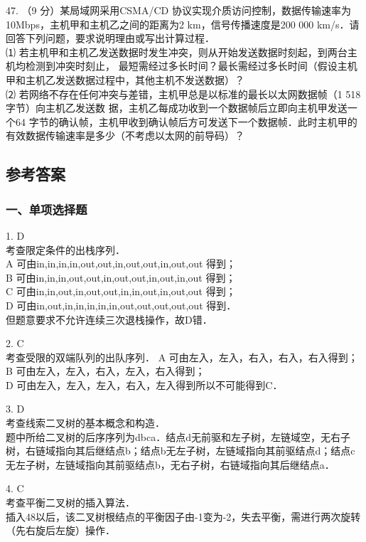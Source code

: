 47. （9 分）某局域网采用CSMA/CD 协议实现介质访问控制，数据传输速率为10Mbps，主机甲和主机乙之间的距离为2 km，信号传播速度是200 000 km/s．请回答下列问题，要求说明理由或写出计算过程． \\
⑴ 若主机甲和主机乙发送数据时发生冲突，则从开始发送数据时刻起，到两台主机均检测到冲突时刻止，
最短需经过多长时间？最长需经过多长时间（假设主机甲和主机乙发送数据过程中，其他主机不发送数据）？ \\
⑵ 若网络不存在任何冲突与差错，主机甲总是以标准的最长以太网数据帧（1 518字节）向主机乙发送数
据，主机乙每成功收到一个数据帧后立即向主机甲发送一个64 字节的确认帧，主机甲收到确认帧后方可发送下一个数据帧．此时主机甲的有效数据传输速率是多少（不考虑以太网的前导码）？

\subsection{参考答案}
\subsubsection{一、单项选择题}

1. D \\
考查限定条件的出栈序列． \\
A 可由in,in,in,in,out,out,in,out,out,in,out,out 得到； \\
B 可由in,in,in,out,out,in,out,out,in,out,in,out 得到； \\
C 可由in,in,out,in,out,out,in,in,out,in,out,out 得到； \\
D 可由in,out,in,in,in,in,in,out,out,out,out,out 得到． \\
但题意要求不允许连续三次退栈操作，故D错．

2. C \\
考查受限的双端队列的出队序列．
A 可由左入，左入，右入，右入，右入得到； \\
B 可由左入，左入，右入，左入，右入得到； \\
D 可由左入，左入，左入，右入，左入得到所以不可能得到C．

3. D \\
考查线索二叉树的基本概念和构造． \\
题中所给二叉树的后序序列为dbca．结点d无前驱和左子树，左链域空，无右子树，右链域指向其后继结点b；结点b无左子树，左链域指向其前驱结点d；结点c无左子树，左链域指向其前驱结点b，无右子树，右链域指向其后继结点a．

4. C \\
考查平衡二叉树的插入算法． \\
插入48以后，该二叉树根结点的平衡因子由-1变为-2，失去平衡，需进行两次旋转（先右旋后左旋）操作．

